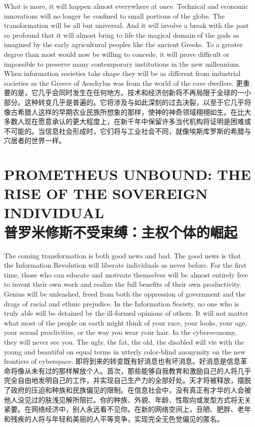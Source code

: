 \begin{paracol}{2}[]
What is more, it will happen almost everywhere at once. Technical and economic innovations will no longer be confined to small portions of the globe. The transformation will be all but universal. And it will involve a break with the past so profound that it will almost bring to life the magical domain of the gods as imagined by the early agricultural peoples like the ancient Greeks. To a greater degree than most would now be willing to concede, it will prove difficult or impossible to preserve many contemporary institutions in the new millennium. When information societies take shape they will be as different from industrial societies as the Greece of Aeschylus was from the world of the cave dwellers.
\switchcolumn
更重要的是，它几乎会同时发生在任何地方。技术和经济创新将不再局限于全球的一小部分。这种转变几乎是普遍的。它将涉及与如此深刻的过去决裂，以至于它几乎将像古希腊人这样的早期农业民族所想象的那样，使神的神奇领域栩栩如生。在比大多数人现在愿意承认的更大程度上，在新千年中保留许多当代机构将证明是困难或不可能的。当信息社会形成时，它们将与工业社会不同，就像埃斯库罗斯的希腊与穴居者的世界一样。
\end{paracol}

\section[主权个体的崛起]{PROMETHEUS UNBOUND: THE RISE OF THE SOVEREIGN INDIVIDUAL\\普罗米修斯不受束缚：主权个体的崛起}
\begin{paracol}{2}[]
The coming transformation is both good news and bad. The good news is that the Information Revolution will liberate individuals as never before. For the first time, those who can educate and motivate themselves will be almost entirely free to invent their own work and realize the full benefits of their own productivity. Genius will be unleashed, freed from both the oppression of government and the drags of racial and ethnic prejudice. In the Information Society, no one who is truly able will be detained by the ill-formed opinions of others. It will not matter what most of the people on earth might think of your race, your looks, your age, your sexual proclivities, or the way you wear your hair. In the cybereconomy, they will never see you. The ugly, the fat, the old, the disabled will vie with the young and beautiful on equal terms in utterly color-blind anonymity on the new frontiers of cyberspace.
\switchcolumn
即将到来的转变既有好消息也有坏消息。好消息是信息革命将像从未有过的那样解放个人。首次，那些能够自我教育和激励自己的人将几乎完全自由地发明自己的工作，并实现自己生产力的全部好处。天才将被释放，摆脱了政府的压迫和种族和民族偏见的限制。在信息社会中，没有真正有才华的人会被他人没见过的肤浅见解所阻拦。你的种族、外貌、年龄、性取向或发型方式将无关紧要。在网络经济中，别人永远看不见你。在新的网络空间上，丑陋、肥胖、老年和残疾的人将与年轻和美丽的人平等竞争，实现完全无色觉偏见的匿名。
\end{paracol}

